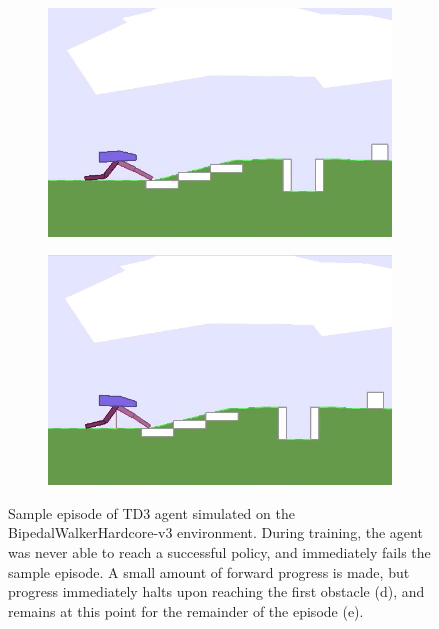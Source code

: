 \documentclass{article}
\begin{document}
\begin{figure}[!p]
\begin{subfigure}{0.18\textwidth}
  \caption{}
  \end{subfigure}
  \begin{subfigure}{0.18\textwidth}
  \centering
  \includegraphics[width=\textwidth]{figures/hardcore/v4}
  \caption{}
  \end{subfigure}
  \begin{subfigure}{0.18\textwidth}
  \centering
  \includegraphics[width=\textwidth]{figures/hardcore/v5}
  \caption{}
  \end{subfigure}
  \caption{Sample episode of TD3 agent simulated on the BipedalWalkerHardcore-v3 environment. During training, the agent was never able to reach a successful policy, and immediately fails the sample episode. A small amount of forward progress is made, but progress immediately halts upon reaching the first obstacle (d), and remains at this point for the remainder of the episode (e).}
  \label{fig:hardcore_episode}
\end{figure}
\end{document}
